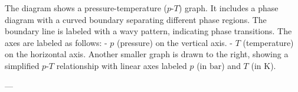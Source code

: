 The diagram shows a pressure-temperature (\(p\)-\(T\)) graph. It includes a phase diagram with a curved boundary separating different phase regions. The boundary line is labeled with a wavy pattern, indicating phase transitions. The axes are labeled as follows:
- \(p\) (pressure) on the vertical axis.
- \(T\) (temperature) on the horizontal axis.
Another smaller graph is drawn to the right, showing a simplified \(p\)-\(T\) relationship with linear axes labeled \(p\) (in \(\text{bar}\)) and \(T\) (in \(\text{K}\)).

---